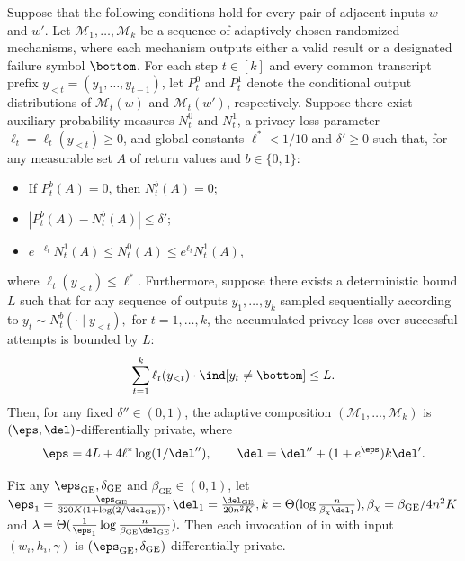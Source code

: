\begin{lemma}
\label{lem:pay-what-you-get}
Suppose that the following conditions hold for every pair of adjacent inputs $w$ and $w'$. Let $\mathcal{M}_1, \dots, \mathcal{M}_k$ be a sequence of adaptively chosen randomized mechanisms, where each mechanism outputs either a valid result or a designated failure symbol $\bottom$.
For each step $t \in [k]$ and every common transcript prefix $y_{<t} = (y_1, \dots, y_{t-1})$, let $P_t^0$ and $P_t^1$ denote the conditional output distributions of $\mathcal{M}_t(w)$ and $\mathcal{M}_t(w')$, respectively. Suppose there exist auxiliary probability measures $N_t^0$ and $N_t^1$, a privacy loss parameter $\ell_t = \ell_t(y_{<t}) \ge 0$, and global constants $\ell^* < 1/10$ and $\delta' \ge 0$ such that, for any measurable set $A$ of return values and $b \in \{0, 1\}$:
\begin{itemize}
    \item If $P_t^b(A)=0$, then $N_t^b(A)=0;$
    \item $|P_t^b(A) - N_t^b(A)| \le \delta';$
    \item $e^{-\ell_t} N_t^1(A) \le N_t^0(A) \le e^{\ell_t} N_t^1(A),$
\end{itemize}
where $\ell_t(y_{<t}) \le \ell^*$.
Furthermore, suppose there exists a deterministic bound  $L$
such that for any sequence of outputs $y_1, \dots, y_k$ sampled sequentially according to
$y_t\sim N_t^b(\cdot\mid y_{<t}),$ for $t=1,\ldots,k$,
the accumulated privacy loss over successful attempts is bounded by $L$:
\begin{equation*}
    \sum_{t=1}^k \ell_t(y_{<t}) \cdot \ind[y_t \ne \bottom] \le L.
\end{equation*}
Then, for any fixed $\delta'' \in (0,1)$, the adaptive composition $(\mathcal{M}_1, \dots, \mathcal{M}_k)$ is $(\eps, \del)$-differentially private, where
\begin{equation*}
    \eps = 4L + 4\ell^*\log(1/\del''), \qquad \del = \del'' + (1+e^{\eps})k\del'.
\end{equation*}
\end{lemma}

\begin{lemma}
\label{lem:gradient_privacy}
Fix any $\eps_{\mathrm{GE}}, \delta_{\mathrm{GE}}$ and $\beta_{\mathrm{GE}}\in(0,1)$, let $\eps_1=\frac{\eps_{\mathrm{GE}}}{320K(1+\log(2/\del_{\mathrm{GE}}))}, \del_1=\frac{\del_{\mathrm{GE}}}{20n^2K}, k=\Theta(\log\frac{n}{\beta_{\chi}\del_1}), \beta_{\chi}=\beta_{\mathrm{GE}}/4n^2K$ and $\lambda=\Theta(\frac{1}{\eps_1}\log\frac{n}{\beta_{\mathrm{GE}}\del_{\mathrm{GE}}}).$ Then each invocation of
 in  with input $(w_i,h_i,\gamma)$ is
$(\eps_{\mathrm{GE}}, \delta_{\mathrm{GE}})$-differentially private.
\end{lemma}


